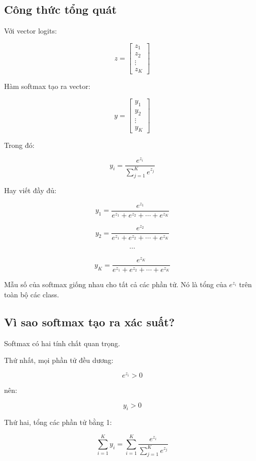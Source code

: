 \subsection{Công thức tổng quát}

Với vector logits:

\[
    z =
    \begin{bmatrix}
    z_1\\
    z_2\\
    \vdots\\
    z_K
    \end{bmatrix}
\]

Hàm softmax tạo ra vector:

\[
    y =
    \begin{bmatrix}
    y_1\\
    y_2\\
    \vdots\\
    y_K
    \end{bmatrix}
\]

Trong đó:

\[
    y_i =
    \frac{e^{z_i}}
    {\sum_{j=1}^{K} e^{z_j}}
\]

Hay viết đầy đủ:

\[
    y_1 =
    \frac{e^{z_1}}
    {e^{z_1}+e^{z_2}+\cdots+e^{z_K}}
\]

\[
    y_2 =
    \frac{e^{z_2}}
    {e^{z_1}+e^{z_2}+\cdots+e^{z_K}}
\]

\[
    \cdots
\]

\[
    y_K =
    \frac{e^{z_K}}
    {e^{z_1}+e^{z_2}+\cdots+e^{z_K}}
\]

\begin{ghinho}
Mẫu số của softmax giống nhau cho tất cả các phần tử. Nó là tổng của $e^{z_i}$ trên toàn bộ các class.
\end{ghinho}

\subsection{Vì sao softmax tạo ra xác suất?}

Softmax có hai tính chất quan trọng.

Thứ nhất, mọi phần tử đều dương:

\[
    e^{z_i} > 0
\]

nên:

\[
    y_i > 0
\]

Thứ hai, tổng các phần tử bằng 1:

\[
    \sum_{i=1}^{K} y_i
    =
    \sum_{i=1}^{K}
    \frac{e^{z_i}}
    {\sum_{j=1}^{K} e^{z_j}}
\]

